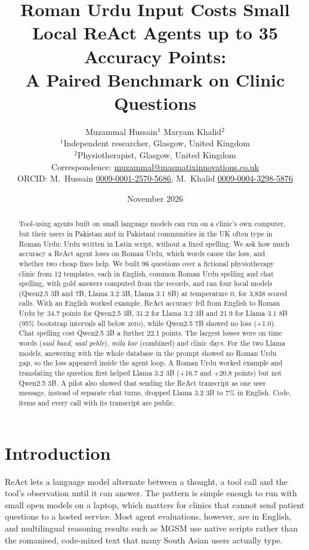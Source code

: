 \documentclass[11pt]{article}
\title{Roman Urdu Input Costs Small Local ReAct Agents up to 35 Accuracy Points:\\A Paired Benchmark on Clinic Questions}
\author{Muzammal Hussain$^{1}$ \qquad Maryam Khalid$^{2}$\\[4pt]
\small $^{1}$Independent researcher, Glasgow, United Kingdom\\
\small $^{2}$Physiotherapist, Glasgow, United Kingdom\\
\small Correspondence: \href{mailto:muzammal@masmatixinnovations.co.uk}{muzammal@masmatixinnovations.co.uk}\\
\small ORCID: M.\ Hussain \href{https://orcid.org/0009-0001-2570-5686}{0009-0001-2570-5686}, M.\ Khalid \href{https://orcid.org/0009-0004-3298-5876}{0009-0004-3298-5876}}
\date{\small November 2026}
\begin{document}
\maketitle

\begin{abstract}
Tool-using agents built on small language models can run on a clinic's own computer, but their users in Pakistan and in Pakistani communities in the UK often type in Roman Urdu: Urdu written in Latin script, without a fixed spelling. We ask how much accuracy a ReAct agent loses on Roman Urdu, which words cause the loss, and whether two cheap fixes help. We built 96 questions over a fictional physiotherapy clinic from 12 templates, each in English, common Roman Urdu spelling and chat spelling, with gold answers computed from the records, and ran four local models (Qwen2.5 3B and 7B, Llama 3.2 3B, Llama 3.1 8B) at temperature 0, for 3,838 scored calls. With an English worked example, ReAct accuracy fell from English to Roman Urdu by 34.7 points for Qwen2.5 3B, 31.2 for Llama 3.2 3B and 21.9 for Llama 3.1 8B (95\% bootstrap intervals all below zero), while Qwen2.5 7B showed no loss (+1.0). Chat spelling cost Qwen2.5 3B a further 22.1 points. The largest losses were on time words (\emph{saal baad}, \emph{saal pehle}), \emph{mila kar} (combined) and clinic days. For the two Llama models, answering with the whole database in the prompt showed no Roman Urdu gap, so the loss appeared inside the agent loop. A Roman Urdu worked example and translating the question first helped Llama 3.2 3B (+16.7 and +20.8 points) but not Qwen2.5 3B. A pilot also showed that sending the ReAct transcript as one user message, instead of separate chat turns, dropped Llama 3.2 3B to 7\% in English. Code, items and every call with its transcript are public.
\end{abstract}

\section{Introduction}
ReAct \citep{yao2023react} lets a language model alternate between a thought, a tool call and the tool's observation until it can answer. The pattern is simple enough to run with small open models on a laptop, which matters for clinics that cannot send patient questions to a hosted service. Most agent evaluations, however, are in English, and multilingual reasoning results such as MGSM \citep{shi2023mgsm} use native scripts rather than the romanised, code-mixed text that many South Asian users actually type.
\end{document}
